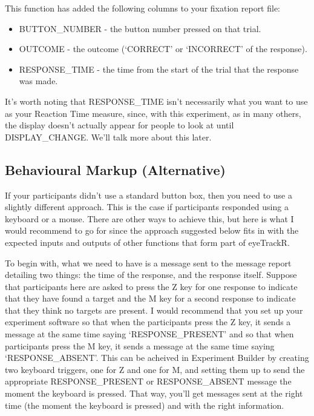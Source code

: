 \documentclass[]{book}
\providecommand{\tightlist}{%
  \setlength{\itemsep}{0pt}\setlength{\parskip}{0pt}}
\begin{document}
This function has added the following columns to your fixation report file:

\begin{itemize}
\tightlist
\item
  BUTTON\_NUMBER - the button number pressed on that trial.
\item
  OUTCOME - the outcome (`CORRECT' or `INCORRECT' of the response).
\item
  RESPONSE\_TIME - the time from the start of the trial that the response was made.
\end{itemize}

It's worth noting that RESPONSE\_TIME isn't necessarily what you want to use as your Reaction Time measure, since, with this experiment, as in many others, the display doesn't actually appear for people to look at until DISPLAY\_CHANGE. We'll talk more about this later.

\hypertarget{bma}{%
\subsection{Behavioural Markup (Alternative)}\label{bma}}

If your participants didn't use a standard button box, then you need to use a slightly different approach. This is the case if participants responded using a keyboard or a mouse. There are other ways to achieve this, but here is what I would recommend to go for since the approach suggested below fits in with the expected inputs and outputs of other functions that form part of eyeTrackR.

To begin with, what we need to have is a message sent to the message report detailing two things: the time of the response, and the response itself. Suppose that participants here are asked to press the Z key for one response to indicate that they have found a target and the M key for a second response to indicate that they think no targets are present. I would recommend that you set up your experiment software so that when the participants press the Z key, it sends a message at the same time saying `RESPONSE\_PRESENT' and so that when participants press the M key, it sends a message at the same time saying `RESPONSE\_ABSENT'. This can be acheived in Experiment Builder by creating two keyboard triggers, one for Z and one for M, and setting them up to send the appropriate RESPONSE\_PRESENT or RESPONSE\_ABSENT message the moment the keyboard is pressed. That way, you'll get messages sent at the right time (the moment the keyboard is pressed) and with the right information.
\end{document}
